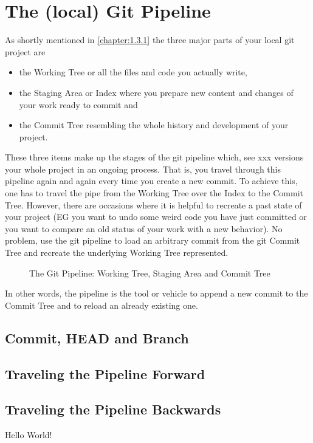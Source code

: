 \chapter{The (local) Git Pipeline}
\label{chapter:2}

As shortly mentioned in \cref{chapter:1.3.1} the three major parts of your local git project are
\begin{itemize}
	\item the Working Tree or all the files and code you actually write,
	\item the Staging Area or Index where you prepare new content and changes of your work ready to commit and 
	\item the Commit Tree resembling the whole history and development of your project. 
\end{itemize}
These three items make up the stages of the git pipeline which, see xxx versions your whole project in an ongoing process. That is,
you travel through this pipeline again and again every time you create a new commit.
To achieve this, one has to travel the pipe from the Working Tree over the Index to the Commit Tree. However, there are occasions 
where it is helpful to recreate a past state of your project (\ac{EG} you want to undo some weird code you have just committed or you 
want to compare an old status of your work with a new behavior). No problem, use the git pipeline to load an arbitrary commit 
from the git Commit Tree and recreate the underlying Working Tree represented.

\begin{figure}[H]
	\centering
	
	\caption{The Git Pipeline: Working Tree, Staging Area and Commit Tree}
	\label{fig}
\end{figure}

In other words, the pipeline is the tool or vehicle to append a new commit to the Commit Tree and to reload an already existing one.

 


\section{Commit, HEAD and Branch}
\label{chapter:2.1}


\section{Traveling the Pipeline Forward}
\label{chapter:2.2}


\section{Traveling the Pipeline Backwards}
\label{chapter:2.3}

Hello World!


